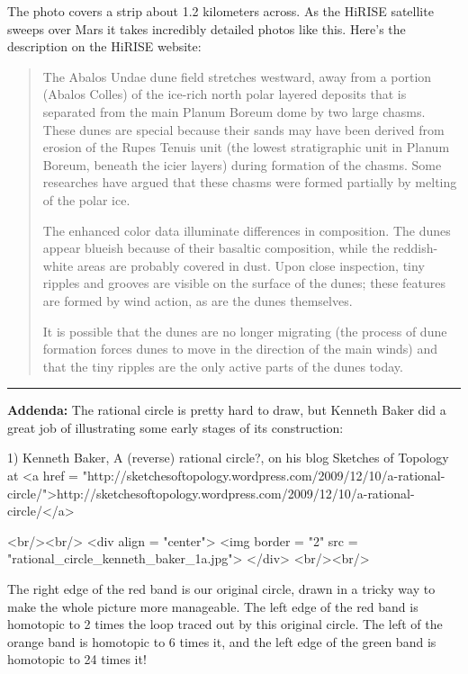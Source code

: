 The photo covers a strip about 1.2 kilometers across.  As the HiRISE
satellite sweeps over Mars it takes incredibly detailed photos like
this.  Here's the description on the HiRISE website:

\begin{quote}
     The Abalos Undae dune field stretches westward, away from a
     portion (Abalos Colles) of the ice-rich north polar layered
     deposits that is separated from the main Planum Boreum dome by
     two large chasms.  These dunes are special because their sands 
     may have been derived from erosion of the Rupes Tenuis unit (the
     lowest stratigraphic unit in Planum Boreum, beneath the icier
     layers) during formation of the chasms.  Some researches have
     argued that these chasms were formed partially by melting of the
     polar ice.

     The enhanced color data illuminate differences in composition.  
     The dunes appear blueish because of their basaltic composition, 
     while the reddish-white areas are probably covered in dust.  
     Upon close inspection, tiny ripples and grooves are visible on 
     the surface of the dunes; these features are formed by wind 
     action, as are the dunes themselves.

     It is possible that the dunes are no longer migrating (the
     process of dune formation forces dunes to move in the direction
     of the main winds) and that the tiny ripples are the only active
     parts of the dunes today.
\end{quote}

\par\noindent\rule{\textwidth}{0.4pt}
\textbf{Addenda:} 
The rational circle is pretty hard to draw, but Kenneth Baker did
a great job of illustrating some early stages of its construction:


1) Kenneth Baker, A (reverse) rational circle?, on his blog Sketches
of Topology at <a href =
"http://sketchesoftopology.wordpress.com/2009/12/10/a-rational-circle/">http://sketchesoftopology.wordpress.com/2009/12/10/a-rational-circle/</a>

<br/><br/>
<div align = "center">
<img border = "2" src = "rational_circle_kenneth_baker_1a.jpg">
</div>
<br/><br/>

The right edge of the red band is our original circle, drawn in a
tricky way to make the whole picture more manageable.  The left edge
of the red band is homotopic to 2 times the loop traced out by this
original circle.  The left of the orange band is homotopic to 6 times
it, and the left edge of the green band is homotopic to 24 times it!

